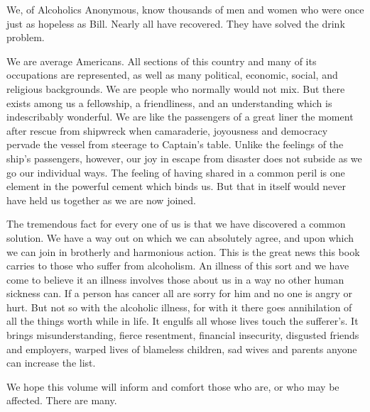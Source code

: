 

\bbChapterPreamble


\begin{biblechapter}
    We, of Alcoholics Anonymous, 
    know thousands of men and women who were once just as hopeless as Bill. 
\verse Nearly all have recovered. 
\verse They have solved the drink problem.

    We are average Americans. 
\verse All sections of this country 
    and many of its occupations are represented, 
    as well as many political, economic, social, 
    and religious backgrounds. 
\verse We are people who normally would not mix. 
\verse But there exists among us a fellowship, 
    a friendliness, 
    and an understanding which is indescribably wonderful. 
\verse We are like the passengers of a great liner 
    the moment after rescue from shipwreck when 
    camaraderie, joyousness and democracy pervade the vessel 
    from steerage to Captain's table. 
\verse Unlike the feelings of the ship's passengers, however, 
    our joy in escape from disaster does not subside 
    as we go our individual ways. 
\verse The feeling of having shared in a common peril is one element 
    in the powerful cement which binds us. 
\verse But that in itself would never have held us together 
    as we are now joined.

    The tremendous fact for every one of us is 
    that we have discovered a common solution. 
\verse We have a way out on which we can absolutely agree, 
    and upon which we can join in brotherly and harmonious action. 
\verse This is the great news this book carries 
    to those who suffer from alcoholism. 
\verse An illness of this sort 
    and we have come to believe it an illness 
    involves those about us in a way no other human sickness can. 
\verse If a person has cancer all are sorry for him 
    and no one is angry or hurt. 
\verse But not so with the alcoholic illness, 
    for with it there goes annihilation 
    of all the things worth while in life. 
\verse It engulfs all whose lives touch the sufferer's. 
\verse It brings misunderstanding, 
    fierce resentment, 
    financial insecurity, 
    disgusted friends and employers, 
    warped lives of blameless children, 
    sad wives and parents anyone can increase the list.

\verse We hope this volume will inform and comfort those who are, 
    or who may be affected. 
\verse There are many.
\end{biblechapter}


